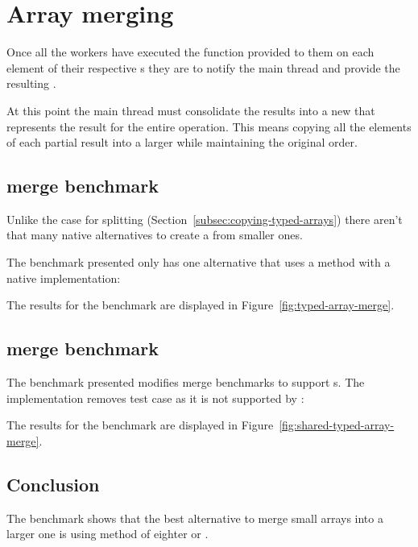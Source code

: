\section{Array merging}

Once all the workers have executed the function provided to them on each element of their respective \ttarray{}s they are to notify the main thread and provide the resulting \ttarray{}.

At this point the main thread must consolidate the results into a new \ttarray{} that represents the result for the entire operation. This means copying all the elements of each partial result into a larger \ttarray{} while maintaining the original order.

\subsection{\ttarray{} merge benchmark}
Unlike the case for \ttarray{} splitting (Section~\ref{subsec:copying-typed-arrays}) there aren't that many native alternatives to create a \ttarray{} from smaller ones.

The benchmark presented only has one alternative that uses a method with a native implementation:

The results for the benchmark are displayed in Figure~\ref{fig:typed-array-merge}.

\subsection{\tstarray{} merge benchmark}

The benchmark presented modifies \ttarray{} merge benchmarks to support \tstarray{}s. The implementation removes \dataview{} test case as it is not supported by \tstarray{}:

The results for the benchmark are displayed in Figure~\ref{fig:shared-typed-array-merge}.

\subsection{Conclusion}
The benchmark shows that the best alternative to merge small arrays into a larger one is using  method of eighter \ttarray or \tstarray.


